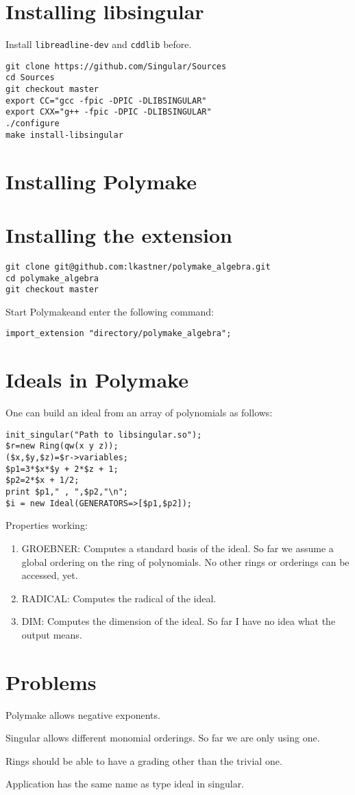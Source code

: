 \documentclass[a4paper]{article}
\newcommand{\PM}{Polymake}
\begin{document}
\section{Installing libsingular}
Install {\tt libreadline-dev} and {\tt cddlib} before.
\begin{verbatim}
git clone https://github.com/Singular/Sources
cd Sources
git checkout master
export CC="gcc -fpic -DPIC -DLIBSINGULAR"
export CXX="g++ -fpic -DPIC -DLIBSINGULAR"
./configure
make install-libsingular
\end{verbatim}
\section{Installing Polymake}

\section{Installing the extension}

\begin{verbatim}
git clone git@github.com:lkastner/polymake_algebra.git
cd polymake_algebra
git checkout master
\end{verbatim}

Start \PM and enter the following command:
\begin{verbatim}
import_extension "directory/polymake_algebra";
\end{verbatim}
\section{Ideals in Polymake}
One can build an ideal from an array of polynomials as follows:
\begin{verbatim}
init_singular("Path to libsingular.so");
$r=new Ring(qw(x y z));
($x,$y,$z)=$r->variables;
$p1=3*$x*$y + 2*$z + 1;
$p2=2*$x + 1/2;
print $p1," , ",$p2,"\n";
$i = new Ideal(GENERATORS=>[$p1,$p2]);
\end{verbatim}
Properties working:
\begin{enumerate}
\item GROEBNER: Computes a standard basis of the ideal. So far we assume a global ordering on the ring of polynomials. No other rings or orderings can be accessed, yet.
\item RADICAL: Computes the radical of the ideal.
\item DIM: Computes the dimension of the ideal. So far I have no idea what the output means.
\end{enumerate}
\section{Problems}
Polymake allows negative exponents.

Singular allows different monomial orderings. So far we are only using one.

Rings should be able to have a grading other than the trivial one.

Application has the same name as type ideal in singular.
\end{document}
